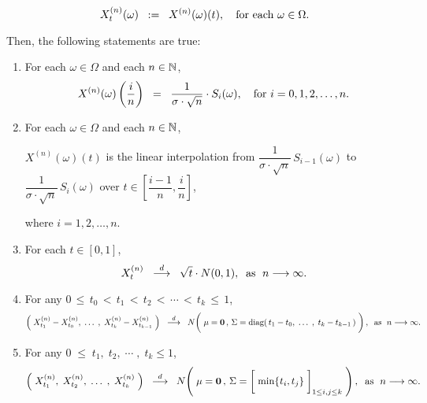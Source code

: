 \begin{proposition}
\begin{itemize}
\begin{equation*}
		X^{(n)}_{t}(\omega) \;\; := \;\; X^{(n)}(\omega)(t),
		\quad
		\textnormal{for each $\omega \in \Omega$}.
		\end{equation*}
\end{itemize}
Then, the following statements are true:
\begin{enumerate}
\item	For each $\omega \in \Omega$ and each $n \in \mathbb{N}$,
		\begin{equation*}
		X^{(n)}(\omega)\left(\dfrac{i}{n}\right) \;\; = \;\; \dfrac{1}{\sigma\cdot\sqrt{n}}\cdot S_{i}(\omega),
		\quad
		\textnormal{for $i = 0, 1, 2, \ldots, n$}.
		\end{equation*}
\item	For each $\omega \in \Omega$ and each $n \in \mathbb{N}$, 
		\begin{center}
		$X^{(n)}(\omega)(t)$\; is the linear interpolation
		from \;$\dfrac{1}{\sigma\cdot\sqrt{n}}\,S_{i-1}(\omega)$\;
		to \;$\dfrac{1}{\sigma\cdot\sqrt{n}}\,S_{i}(\omega)$\;
		over \;$t \in \left[\dfrac{i-1}{n},\dfrac{i}{n}\right]$,
		\end{center}
		where $i = 1, 2, \ldots, n$.
\item	For each $t \in [0,1]$,
		\begin{equation*}
		X^{(n)}_{t} \;\; \overset{d}{\longrightarrow} \;\; \sqrt{t}\cdot N(0,1),
		\;\;\textnormal{as \;$n \longrightarrow \infty$}.
		\end{equation*}
\item	For any \;$0 \,\leq\, t_{0} \,<\, t_{1} \,<\, t_{2} \,<\, \cdots \,<\, t_{k} \,\leq\, 1$,
		\begin{equation*}
		\left(\;X^{(n)}_{t_{1}} - X^{(n)}_{t_{0}}, \;\ldots\;,\; X^{(n)}_{t_{k}} - X^{(n)}_{t_{k-1}}\;\right)
		\;\; \overset{d}{\longrightarrow} \;\;
		N\!\left(\;
		\mathbf{\mu} = \mathbf{0}\,,\,
		\overset{{\color{white}1}}{\Sigma} = \diag\!\left(\,t_{1}-t_{0},\; \ldots\; ,\; t_{k}-t_{k-1}\,\right)
		\;\right),
		\;\;
		\textnormal{as \;$n \longrightarrow \infty$}.
		\end{equation*}
\item	For any \;$0 \;\leq\; t_{1},\; t_{2}, \;\cdots\;,\; t_{k} \leq 1$,
		\begin{equation*}
		\left(\;X^{(n)}_{t_{1}},\; X^{(n)}_{t_{2}}, \;\ldots\;,\; X^{(n)}_{t_{k}}\;\right)
		\;\; \overset{d}{\longrightarrow} \;\;
		N\!\left(\;
		\mathbf{\mu} = \mathbf{0}\,,\,
		\Sigma = \left[\;\min\{\overset{{\color{white}1}}{t}_{i},t_{j}\}\;\right]_{1\leq i,j\leq k}
		\;\right),
		\;\;\textnormal{as \;$n \longrightarrow \infty$}.
		\end{equation*}
\end{enumerate}
\end{proposition}
